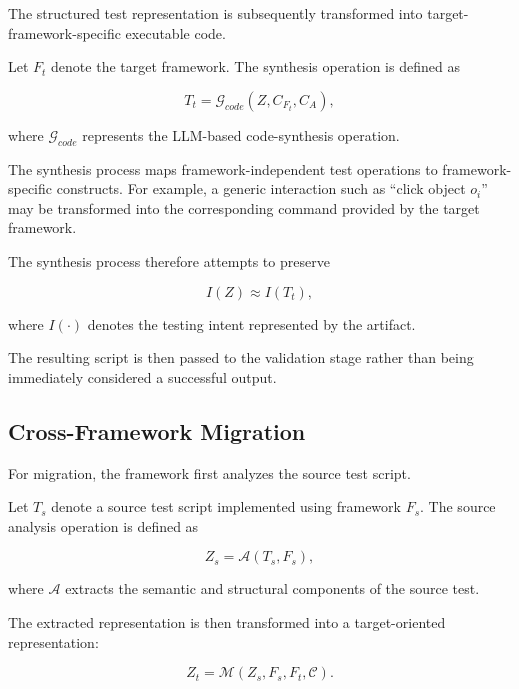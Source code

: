\documentclass[pdflatex,sn-mathphys-num]{sn-jnl}
\begin{document}
The structured test representation is subsequently transformed into
target-framework-specific executable code.

Let $F_t$ denote the target framework. The synthesis operation is defined as

\begin{equation}
    T_t
    =
    \mathcal{G}_{code}
    (
        Z,
        C_{F_t},
        C_A
    ),
\label{eq:script-synthesis}
\end{equation}

where $\mathcal{G}_{code}$ represents the LLM-based code-synthesis
operation.

The synthesis process maps framework-independent test operations to
framework-specific constructs. For example, a generic interaction such as
``click object $o_i$'' may be transformed into the corresponding command
provided by the target framework.

The synthesis process therefore attempts to preserve

\begin{equation}
    I(Z) \approx I(T_t),
\label{eq:synthesis-intent}
\end{equation}

where $I(\cdot)$ denotes the testing intent represented by the artifact.

The resulting script is then passed to the validation stage rather than
being immediately considered a successful output.

\subsection{Cross-Framework Migration}
\label{subsec:cross-framework-migration}

For migration, the framework first analyzes the source test script.

Let $T_s$ denote a source test script implemented using framework $F_s$.
The source analysis operation is defined as

\begin{equation}
    Z_s
    =
    \mathcal{A}
    (
        T_s,F_s
    ),
\label{eq:source-analysis}
\end{equation}

where $\mathcal{A}$ extracts the semantic and structural components of the
source test.

The extracted representation is then transformed into a target-oriented
representation:

\begin{equation}
    Z_t
    =
    \mathcal{M}
    (
        Z_s,
        F_s,
        F_t,
        \mathcal{C}
    ).
\label{eq:representation-migration}
\end{equation}
\end{document}
